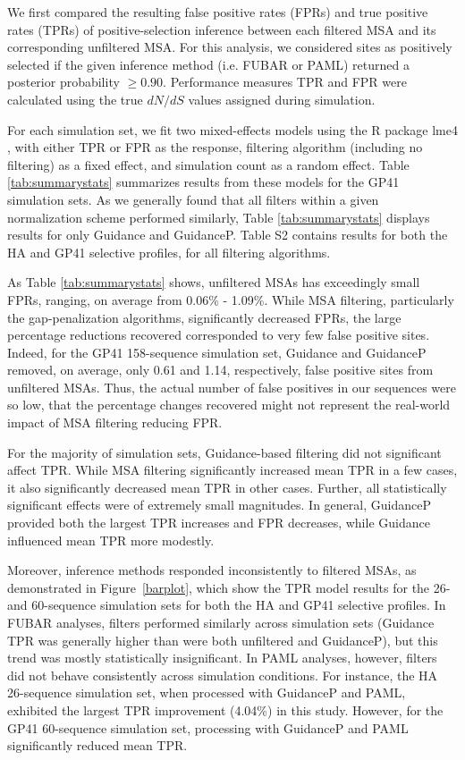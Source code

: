 \documentclass[11pt]{article}
\begin{document}
We first compared the resulting false positive rates (FPRs) and true positive rates (TPRs) of positive-selection inference between each filtered MSA and its corresponding unfiltered MSA. For this analysis, we considered sites as positively selected if the given inference method (i.e. FUBAR or PAML) returned a posterior probability $\geq0.90$. Performance measures TPR and FPR were calculated using the true $dN/dS$ values assigned during simulation. 

For each simulation set, we fit two mixed-effects models using the R package lme4 \citep{Bates2012}, with either TPR or FPR as the response, filtering algorithm (including no filtering) as a fixed effect, and simulation count as a random effect. Table \ref{tab:summarystats} summarizes results from these models for the GP41 simulation sets. As we generally found that all filters within a given normalization scheme performed similarly, Table \ref{tab:summarystats} displays results for only Guidance and GuidanceP. Table S2 contains results for both the HA and GP41 selective profiles, for all filtering algorithms.

As Table \ref{tab:summarystats} shows, unfiltered MSAs has exceedingly small FPRs, ranging, on average from 0.06\% - 1.09\%. While MSA filtering, particularly the gap-penalization algorithms, significantly decreased FPRs, the large percentage reductions recovered corresponded to very few false positive sites. Indeed, for the GP41 158-sequence simulation set, Guidance and GuidanceP removed, on average, only 0.61 and 1.14, respectively, false positive sites from unfiltered MSAs. Thus, the actual number of false positives in our sequences were so low, that the percentage changes recovered might not represent the real-world impact of MSA filtering reducing FPR. 

For the majority of simulation sets, Guidance-based filtering did not significant affect TPR. While MSA filtering significantly increased mean TPR in a few cases, it also significantly decreased mean TPR in other cases. Further, all statistically significant effects were of extremely small magnitudes. In general, GuidanceP provided both the largest TPR increases and FPR decreases, while Guidance influenced mean TPR more modestly. 

Moreover, inference methods responded inconsistently to filtered MSAs, as demonstrated in Figure~\ref{barplot}, which show the TPR model results for the 26- and 60-sequence simulation sets for both the HA and GP41 selective profiles. In FUBAR analyses, filters performed similarly across simulation sets (Guidance TPR was generally higher than were both unfiltered and GuidanceP), but this trend was mostly statistically insignificant. In PAML analyses, however, filters did not behave consistently across simulation conditions. For instance, the HA 26-sequence simulation set, when processed with GuidanceP and PAML, exhibited the largest TPR improvement (4.04\%) in this study. However, for the GP41 60-sequence simulation set, processing with GuidanceP and PAML significantly reduced mean TPR.
\end{document}
